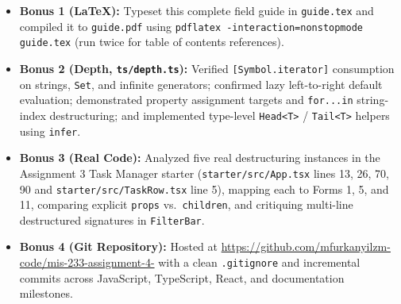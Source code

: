 \documentclass[11pt, a4paper]{article}
\begin{document}
\begin{itemize}
  \item \textbf{Bonus 1 (LaTeX):} Typeset this complete field guide in \texttt{guide.tex} and compiled it to \texttt{guide.pdf} using \texttt{pdflatex -interaction=nonstopmode guide.tex} (run twice for table of contents references).
  \item \textbf{Bonus 2 (Depth, \texttt{ts/depth.ts}):} Verified \texttt{[Symbol.iterator]} consumption on strings, \texttt{Set}, and infinite generators; confirmed lazy left-to-right default evaluation; demonstrated property assignment targets and \texttt{for...in} string-index destructuring; and implemented type-level \texttt{Head<T>} / \texttt{Tail<T>} helpers using \texttt{infer}.
  \item \textbf{Bonus 3 (Real Code):} Analyzed five real destructuring instances in the Assignment 3 Task Manager starter (\texttt{starter/src/App.tsx} lines 13, 26, 70, 90 and \texttt{starter/src/TaskRow.tsx} line 5), mapping each to Forms 1, 5, and 11, comparing explicit \texttt{props} vs.\ \texttt{children}, and critiquing multi-line destructured signatures in \texttt{FilterBar}.
  \item \textbf{Bonus 4 (Git Repository):} Hosted at \url{https://github.com/mfurkanyilzm-code/mis-233-assignment-4-} with a clean \texttt{.gitignore} and incremental commits across JavaScript, TypeScript, React, and documentation milestones.
\end{itemize}
\end{document}
